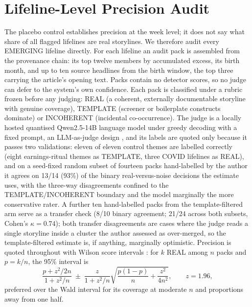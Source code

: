\documentclass[a4paper,12pt]{report}
\begin{document}
\section{Lifeline-Level Precision Audit}
\label{sec:precisionaudit}
The placebo control establishes precision at the week level; it does not say
what share of all flagged lifelines are real storylines. We therefore
audit every EMERGING lifeline directly. For each lifeline an audit pack is
assembled from the provenance chain: its top twelve members by accumulated
excess, its birth month, and up to ten source headlines from the birth
window, the top three carrying the article's opening text. Packs contain no
detector scores, so no judge can defer to the system's own confidence. Each
pack is classified under a rubric frozen before any judging: REAL (a
coherent, externally documentable storyline with genuine coverage),
TEMPLATE (screener or boilerplate constructs dominate) or
INCOHERENT (incidental co-occurrence). The judge is a locally hosted
quantised Qwen2.5-14B language model under greedy decoding with a fixed
prompt, an LLM-as-judge design \citep{Zheng2023Judge}, and its labels are
quoted only because it passes two validations:
eleven of eleven control themes are labelled correctly (eight earnings-ritual
themes as TEMPLATE, three COVID lifelines as REAL), and on a seed-fixed
random subset of fourteen packs hand-labelled by the author it agrees on
13/14 (93\%) of the binary real-versus-noise decisions the estimate uses,
with the three-way disagreements confined to the TEMPLATE/INCOHERENT
boundary and the model marginally the more conservative rater. A further
ten hand-labelled packs from the template-filtered arm serve as a transfer
check (8/10 binary agreement; 21/24 across both subsets, Cohen's
$\kappa = 0.74$); both transfer
disagreements are cases where the judge reads a single storyline inside a
cluster the author assessed as over-merged, so the template-filtered
estimate is, if anything, marginally optimistic. Precision is quoted
throughout with Wilson score intervals \citep{Wilson1927}: for $k$ REAL
among $n$ packs and
$p = k/n$, the 95\% interval is
\begin{equation}
\frac{p + z^2/2n}{1 + z^2/n} \;\pm\; \frac{z}{1 + z^2/n}
\sqrt{\frac{p(1-p)}{n} + \frac{z^2}{4n^2}}, \qquad z = 1.96,
\label{eq:wilson}
\end{equation}
preferred over the Wald interval for its coverage at moderate $n$ and
proportions away from one half.
\end{document}
